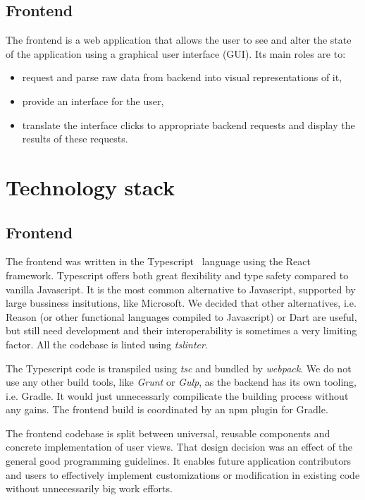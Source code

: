 \documentclass[licencjacka,en]{thesisclass}
\begin{document}
    \subsection{Frontend}
    The frontend is a web application that allows the user to see
    and alter the state of the application using a graphical user interface (GUI).
    Its main roles are to:
    \begin{itemize}
        \item request and parse raw data from backend into visual representations of it,
        \item provide an interface for the user,
        \item translate the interface clicks to appropriate backend requests
          and display the results of these requests.
    \end{itemize}

    \section{Technology stack}

    \subsection{Frontend}

    The frontend was written in the Typescript~\cite{Typescript} language
    using the React~\cite{React} framework.
    Typescript offers both great flexibility and type safety compared to vanilla Javascript.
    It is the most common alternative to Javascript,
    supported by large bussiness insitutions, like Microsoft.
    We decided that other alternatives,
    i.e. Reason (or other functional languages compiled to Javascript) or Dart are useful,
    but still need development and their interoperability is sometimes a very limiting factor.
    All the codebase is linted using \textit{tslinter}.

    The Typescript code is transpiled
    using \textit{tsc} and bundled by \textit{webpack}.
    We do not use any other build tools, like
    \textit{Grunt} or \textit{Gulp}, as the backend has its own tooling, i.e. Gradle.
    It would just unnecessarly compilicate the building process without any gains.
    The frontend build is coordinated by an npm plugin for Gradle.

    The frontend codebase is split between universal,
    reusable components
    and concrete implementation of user views.
    That design decision was an effect of the general good programming guidelines.
    It enables future application contributors and users
    to effectively implement customizations or modification
    in existing code without unnecessarily big work efforts.
\end{document}
